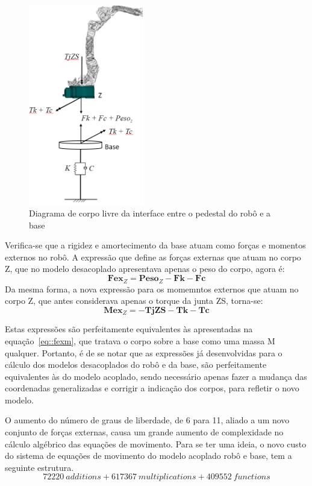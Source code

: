 \begin{figure}[h]
	\centering 
 	\includegraphics[width=0.45\textwidth]{figs/dcl_interface}
 	\caption{Diagrama de corpo livre da interface entre o pedestal do robô e a
 	base}
 	\label{fig::dcl_interface}
\end{figure}

Verifica-se que a rigidez e amortecimento da base atuam como forças e momentos
externos no robô. A expressão que define as forças externas que atuam no corpo
Z, que no modelo desacoplado apresentava apenas o peso do corpo, agora é:
%
\begin{equation}
	\mathbf{Fex}_Z = \mathbf{Peso}_Z - \mathbf{Fk} - \mathbf{Fc}
\end{equation}
%
Da mesma forma, a nova expressão para os momemntos externos que atuam no corpo
Z, que antes considerava apenas o torque da junta ZS, torna-se:
%
\begin{equation}
	\mathbf{Mex}_Z = -\mathbf{TjZS} - \mathbf{Tk} - \mathbf{Tc}
\end{equation}
%

Estas expressões são perfeitamente equivalentes às apresentadas na
equação~\ref{eq::fexm}, que tratava o corpo sobre a base como uma massa M
qualquer. Portanto, é de se notar que as expressões já desenvolvidas para o
cálculo dos modelos desacoplados do robô e da base, são perfeitamente
equivalentes às do modelo acoplado, sendo necessário apenas fazer a mudança das
coordenadas generalizadas e corrigir a indicação dos corpos, para refletir o
novo modelo.

O aumento do número de graus de liberdade, de 6 para 11, aliado a um novo
conjunto de forças externas, causa um grande aumento de complexidade no
cálculo algébrico das equações de movimento. Para se ter uma ideia, o novo custo
do sistema de equações de movimento do modelo acoplado robô e base, tem a
seguinte estrutura.
%
$$ 72220~\textit{additions} + 617367~\textit{multiplications} + 409552~
\textit{functions} $$
%


